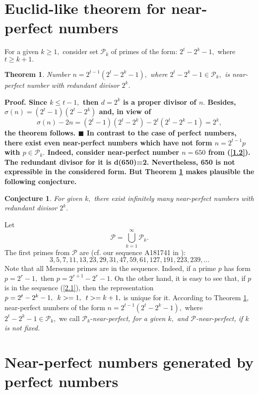 \documentclass[12pt]{amsart}
\newtheorem{theorem}{Theorem}
\newtheorem{conjecture}{Conjecture}
\numberwithin{equation}{section}
\begin{document}
 \section{Euclid-like theorem for near-perfect numbers}
For a given $k\geq1,$ consider set $\mathcal{P}_k$ of primes of the form: $2^t-2^k-1,$ where $t\geq k+1.$
\begin{theorem} \label{t3}
Number  $n=2^{t-1}(2^t-2^k-1),$ where $2^t-2^k-1\in \mathcal{P}_k,$ is near-perfect number with redundant divisor $2^k.$
\end{theorem}
\bfseries Proof. \mdseries Since $k\leq t-1,$ then $d=2^k$ is a proper divisor of $n.$
 Besides, $\sigma(n)=(2^t-1)(2^t-2^k)$ and, in view of
 $$\sigma(n)-2n=(2^t-1)(2^t-2^k) -2^t(2^t-2^k-1)=2^k,$$
 the theorem follows. $\blacksquare$ \newline
In contrast to the case of perfect numbers, there exist even near-perfect numbers which have not form $n=2^{t-1}p$ with $p\in \mathcal{P}_k.$
 Indeed, consider near-perfect number $n=650$ from (\ref{1.2}). The redundant divisor for it is d(650)=2. Nevertheless, 650 is not expressible in the considered form. But Theorem \ref{t3} makes plausible the following conjecture.
 \begin{conjecture} \label{c1}
 For given $k,$ there exist infinitely many near-perfect numbers with redundant divisor $2^k.$
 \end{conjecture}
 Let
 $$\mathcal{P}=\bigcup _{k=1}^\infty \mathcal{P}_k.$$\newpage
 The first primes from $\mathcal{P}$ are (cf. our sequence A181741 in \cite{4}):
 \begin{equation}\label{2.1}
  3,5,7,11,13,23,29,31,47,59,61,127,191,223,239,...
  \end{equation}
  Note that all Mersenne primes are in the sequence. Indeed, if a prime $p$ has form $p=2^r-1,$ then $p=2^{r+1}-2^r-1.$ On the other hand, it is easy to see that, if $p$ is in the sequence (\ref{2.1}), then the representation $p=2^t-2^k-1,\enskip k>=1,\enskip t>=k+1,$ is unique for it.\newline
  \indent According to Theorem \ref{t3}, near-perfect numbers of the form $n=2^{t-1}(2^t-2^k-1),$ where $2^t-2^k-1\in \mathcal{P}_k,$ we call $\mathcal{P}_k$-\slshape near-perfect, \upshape for a given $k,$ and $\mathcal{P}$-\slshape near-perfect\upshape, if $k$ is not fixed.

  \section{Near-perfect numbers generated by perfect numbers}
\end{document}
